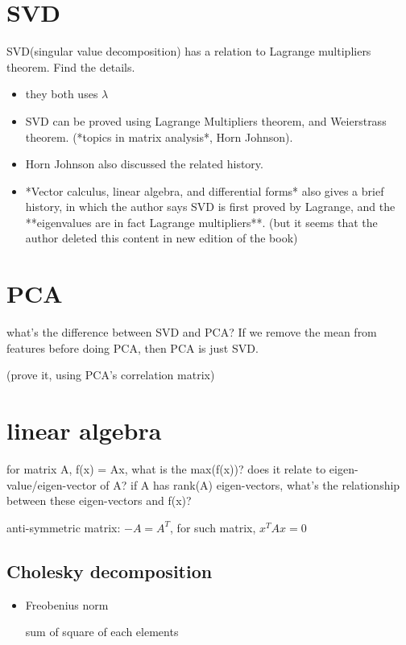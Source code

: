 \documentclass[10pt,a4paper]{book}
\begin{document}
\section{SVD}   
SVD(singular value decomposition) has a relation to Lagrange multipliers theorem. Find the details.   
\begin{itemize}


\item they both uses $\lambda$
\item SVD can be proved using Lagrange Multipliers theorem, and Weierstrass theorem. (*topics in matrix analysis*, Horn Johnson).
\item Horn Johnson also discussed the related history.
\item *Vector calculus, linear algebra, and differential forms* also gives a brief history, in which the author says SVD is first proved by Lagrange, and the **eigenvalues are in fact Lagrange multipliers**. (but it seems that the author deleted this content in new edition of the book)
\end{itemize}


\section{PCA}
what's the difference between SVD and PCA?
If we remove the mean from features before doing PCA, then PCA is just SVD.

(prove it, using PCA's correlation matrix)

\section{linear algebra}
for matrix A, f(x) = Ax, what is the max(f(x))? does it relate to eigen-value/eigen-vector of A? if A has rank(A) eigen-vectors, what's the relationship between these eigen-vectors and f(x)?

anti-symmetric matrix:
$-A = A^T$, 
for such matrix, $x^TAx = 0$

\subsection {Cholesky decomposition}

\begin{itemize}
	\item Freobenius norm
	
	sum of square of each elements
	
\end{itemize}
\end{document}
